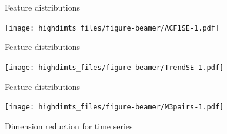 \documentclass[14pt,ignorenonframetext,]{beamer}
\begin{document}
\begin{frame}{Feature distributions}
\protect\hypertarget{feature-distributions}{}

\texttt{[image: highdimts\_files/figure-beamer/ACF1SE-1.pdf]}

\end{frame}

\begin{frame}{Feature distributions}
\protect\hypertarget{feature-distributions-1}{}

\texttt{[image: highdimts\_files/figure-beamer/TrendSE-1.pdf]}

\end{frame}

\begin{frame}{Feature distributions}
\protect\hypertarget{feature-distributions-2}{}

\texttt{[image: highdimts\_files/figure-beamer/M3pairs-1.pdf]}

\end{frame}

\begin{frame}{Dimension reduction for time series}
\protect\hypertarget{dimension-reduction-for-time-series}{}





\end{frame}
\end{document}
